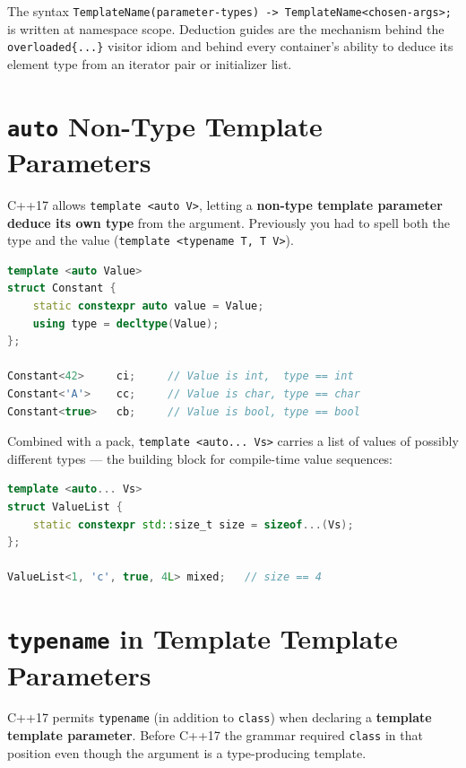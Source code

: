 The syntax \texttt{TemplateName(parameter-types) -> TemplateName<chosen-args>;} is written at namespace scope. Deduction guides are the mechanism behind the \texttt{overloaded\{...\}} visitor idiom and behind every container's ability to deduce its element type from an iterator pair or initializer list.

\section{\texttt{auto} Non-Type Template Parameters}
\label{sec:c17-auto-nttp}

C++17 allows \texttt{template <auto V>}, letting a \textbf{non-type template parameter deduce its own type} from the argument. Previously you had to spell both the type and the value (\texttt{template <typename T, T V>}).

\begin{lstlisting}[language=C++,caption={auto NTTP deduces the value's type}]
template <auto Value>
struct Constant {
    static constexpr auto value = Value;
    using type = decltype(Value);
};

Constant<42>     ci;     // Value is int,  type == int
Constant<'A'>    cc;     // Value is char, type == char
Constant<true>   cb;     // Value is bool, type == bool
\end{lstlisting}

Combined with a pack, \texttt{template <auto... Vs>} carries a list of values of possibly different types --- the building block for compile-time value sequences:

\begin{lstlisting}[language=C++,caption={A heterogeneous compile-time value pack}]
template <auto... Vs>
struct ValueList {
    static constexpr std::size_t size = sizeof...(Vs);
};

ValueList<1, 'c', true, 4L> mixed;   // size == 4
\end{lstlisting}

\section{\texttt{typename} in Template Template Parameters}
\label{sec:c17-typename-ttp}

C++17 permits \texttt{typename} (in addition to \texttt{class}) when declaring a \textbf{template template parameter}. Before C++17 the grammar required \texttt{class} in that position even though the argument is a type-producing template.


